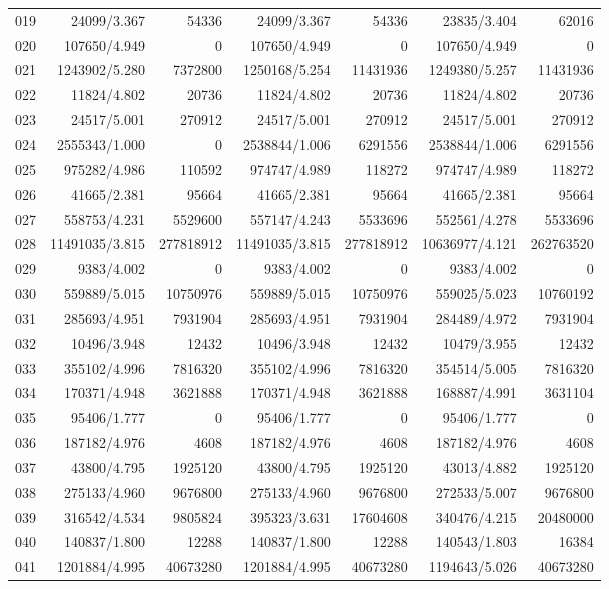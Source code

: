 \begin{longtable}{crrrrrr}
019 & 24099/3.367 & 54336 & 24099/3.367 & 54336 & 23835/3.404 & 62016 \\
020 & 107650/4.949 & 0 & 107650/4.949 & 0 & 107650/4.949 & 0 \\
021 & 1243902/5.280 & 7372800 & 1250168/5.254 & 11431936 & 1249380/5.257 & 11431936 \\
022 & 11824/4.802 & 20736 & 11824/4.802 & 20736 & 11824/4.802 & 20736 \\
023 & 24517/5.001 & 270912 & 24517/5.001 & 270912 & 24517/5.001 & 270912 \\
024 & 2555343/1.000 & 0 & 2538844/1.006 & 6291556 & 2538844/1.006 & 6291556 \\
025 & 975282/4.986 & 110592 & 974747/4.989 & 118272 & 974747/4.989 & 118272 \\
026 & 41665/2.381 & 95664 & 41665/2.381 & 95664 & 41665/2.381 & 95664 \\
027 & 558753/4.231 & 5529600 & 557147/4.243 & 5533696 & 552561/4.278 & 5533696 \\
028 & 11491035/3.815 & 277818912 & 11491035/3.815 & 277818912 & 10636977/4.121 & 262763520 \\
029 & 9383/4.002 & 0 & 9383/4.002 & 0 & 9383/4.002 & 0 \\
030 & 559889/5.015 & 10750976 & 559889/5.015 & 10750976 & 559025/5.023 & 10760192 \\
031 & 285693/4.951 & 7931904 & 285693/4.951 & 7931904 & 284489/4.972 & 7931904 \\
032 & 10496/3.948 & 12432 & 10496/3.948 & 12432 & 10479/3.955 & 12432 \\
033 & 355102/4.996 & 7816320 & 355102/4.996 & 7816320 & 354514/5.005 & 7816320 \\
034 & 170371/4.948 & 3621888 & 170371/4.948 & 3621888 & 168887/4.991 & 3631104 \\
035 & 95406/1.777 & 0 & 95406/1.777 & 0 & 95406/1.777 & 0 \\
036 & 187182/4.976 & 4608 & 187182/4.976 & 4608 & 187182/4.976 & 4608 \\
037 & 43800/4.795 & 1925120 & 43800/4.795 & 1925120 & 43013/4.882 & 1925120 \\
038 & 275133/4.960 & 9676800 & 275133/4.960 & 9676800 & 272533/5.007 & 9676800 \\
039 & 316542/4.534 & 9805824 & 395323/3.631 & 17604608 & 340476/4.215 & 20480000 \\
040 & 140837/1.800 & 12288 & 140837/1.800 & 12288 & 140543/1.803 & 16384 \\
041 & 1201884/4.995 & 40673280 & 1201884/4.995 & 40673280 & 1194643/5.026 & 40673280 \\

\end{longtable}
